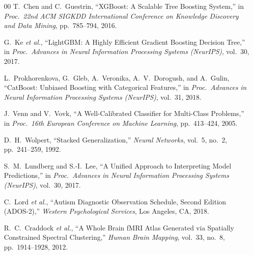 \documentclass[conference]{IEEEtran}
\begin{document}
\begin{thebibliography}{00}
T.~Chen and C.~Guestrin, ``XGBoost: A Scalable Tree Boosting System,''
in \textit{Proc.~22nd ACM SIGKDD International Conference on Knowledge
Discovery and Data Mining}, pp.~785--794, 2016.

G.~Ke \textit{et al.}, ``LightGBM: A Highly Efficient Gradient Boosting
Decision Tree,'' in \textit{Proc.~Advances in Neural Information
Processing Systems (NeurIPS)}, vol.~30, 2017.

L.~Prokhorenkova, G.~Gleb, A.~Veronika, A.~V.~Dorogush, and
A.~Gulin, ``CatBoost: Unbiased Boosting with Categorical Features,''
in \textit{Proc.~Advances in Neural Information Processing Systems
(NeurIPS)}, vol.~31, 2018.

J.~Venn and V.~Vovk, ``A Well-Calibrated Classifier for Multi-Class
Problems,'' in \textit{Proc.~16th European Conference on Machine
Learning}, pp.~413--424, 2005.

D.~H.~Wolpert, ``Stacked Generalization,'' \textit{Neural Networks},
vol.~5, no.~2, pp.~241--259, 1992.

S.~M.~Lundberg and S.-I.~Lee, ``A Unified Approach to Interpreting
Model Predictions,'' in \textit{Proc.~Advances in Neural Information
Processing Systems (NeurIPS)}, vol.~30, 2017.

C.~Lord \textit{et al.}, ``Autism Diagnostic Observation Schedule,
Second Edition (ADOS-2),'' \textit{Western Psychological Services},
Los Angeles, CA, 2018.

R.~C.~Craddock \textit{et al.}, ``A Whole Brain fMRI Atlas Generated
via Spatially Constrained Spectral Clustering,'' \textit{Human Brain
Mapping}, vol.~33, no.~8, pp.~1914--1928, 2012.

\end{thebibliography}
\end{document}
